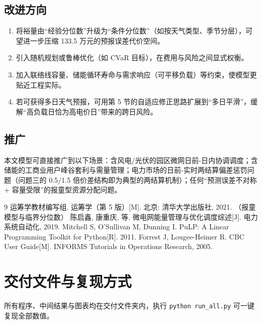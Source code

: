 \documentclass{cumcmthesis}
\begin{document}
\subsection{改进方向}
\begin{enumerate}
    \item 将裕量由“经验分位数”升级为“条件分位数”（如按天气类型、季节分层），可望进一步压缩 133.5 万元的预报误差代价空间。
    \item 引入随机规划或鲁棒优化（如 CVaR 目标），在费用与风险之间显式权衡。
    \item 加入联络线容量、储能循环寿命与需求响应（可平移负载）等约束，使模型更贴近工程实际。
    \item 若可获得多日天气预报，可用第 5 节的自适应修正思路扩展到“多日平滑”，缓解“高负载日恰为高电价日”带来的跨日风险。
\end{enumerate}

\subsection{推广}
本文模型可直接推广到以下场景：含风电/光伏的园区微网日前-日内协调调度；含储能的工商业用户峰谷套利与需量管理；电力市场的日前-实时两结算偏差惩罚问题（问题三的 0.5/1.5 倍价差结构即为典型的两结算机制）；任何“预测误差不对称 + 容量受限”的报童型资源分配问题。

\begin{thebibliography}{9}
 运筹学教材编写组. 运筹学（第 5 版）[M]. 北京: 清华大学出版社, 2021. （报童模型与临界分位数）
 陈启鑫, 康重庆, 等. 微电网能量管理与优化调度综述[J]. 电力系统自动化, 2019.
 Mitchell S, O'Sullivan M, Dunning I. PuLP: A Linear Programming Toolkit for Python[R]. 2011.
 Forrest J, Lougee-Heimer R. CBC User Guide[M]. INFORMS Tutorials in Operations Research, 2005.
\end{thebibliography}

\appendix
\section{交付文件与复现方式}
所有程序、中间结果与图表均在交付文件夹内，执行 \texttt{python run\_all.py} 可一键复现全部数值。
\end{document}
